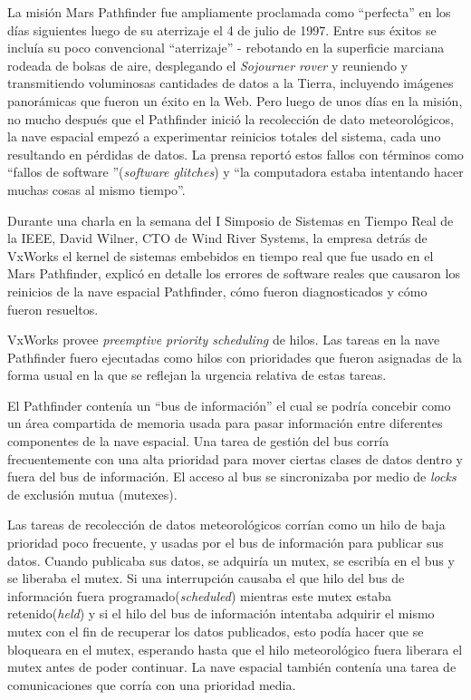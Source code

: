 La misión Mars Pathfinder fue ampliamente proclamada como ``perfecta'' en los días siguientes luego de su aterrizaje el 4 de julio de 1997. Entre sus éxitos se incluía su poco convencional ``aterrizaje'' - rebotando en la superficie marciana rodeada de bolsas de aire, desplegando el \textit{Sojourner rover} y reuniendo y transmitiendo voluminosas cantidades de datos a la Tierra, incluyendo imágenes panorámicas que fueron un éxito en la Web. Pero luego de unos días en la misión, no mucho después que el Pathfinder inició la recolección de dato meteorológicos, la nave espacial empezó a experimentar reinicios totales del sistema, cada uno resultando en pérdidas de datos. La prensa reportó estos fallos con términos como ``fallos de software ''(\textit{software glitches}) y ``la computadora estaba intentando hacer muchas cosas al mismo tiempo''.

Durante una charla en la semana del I Simposio de Sistemas en Tiempo Real de la IEEE, David Wilner, CTO de Wind River Systems, la empresa detrás de VxWorks el kernel de sistemas embebidos en tiempo real que fue usado en el Mars Pathfinder, explicó en detalle los errores de software reales que causaron los reinicios de la nave espacial Pathfinder, cómo fueron diagnosticados y cómo fueron resueltos. 

VxWorks provee \textit{preemptive priority scheduling} de hilos. Las tareas en la nave Pathfinder fuero ejecutadas como hilos con prioridades que fueron asignadas de la forma usual en la que se reflejan la urgencia relativa de estas tareas.

El Pathfinder contenía un ``bus de información'' el cual se podría concebir como un área compartida de memoria usada para pasar información entre diferentes componentes de la nave espacial. Una tarea de gestión del bus corría frecuentemente con una alta prioridad para mover ciertas clases de datos dentro y fuera del bus de información. El acceso al bus se sincronizaba por medio de \textit{locks} de exclusión mutua (mutexes).


Las tareas de recolección de datos meteorológicos corrían como un hilo de baja prioridad poco frecuente, y usadas por el bus de información para publicar sus datos. Cuando publicaba sus datos, se adquiría un mutex, se escribía en el bus y se liberaba el mutex. Si una interrupción causaba el que hilo del bus de información fuera programado(\textit{scheduled}) mientras este mutex estaba retenido(\textit{held}) y si el hilo del bus de información intentaba adquirir el mismo mutex con el fin de recuperar los datos publicados, esto podía hacer que se bloqueara en el mutex, esperando hasta que el hilo meteorológico fuera liberara el mutex antes de poder continuar. La nave espacial también contenía una tarea de comunicaciones que corría con una prioridad media. 


